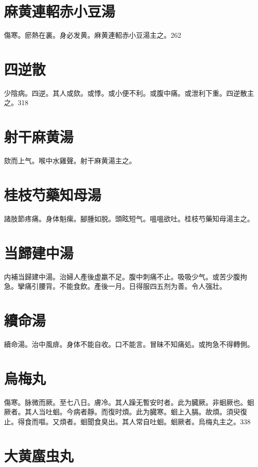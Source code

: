 \documentclass[12pt,oneside,UTF8,b5paper]{ctexbook}她她她她她她她
\begin{document}
\section{麻黄連軺赤小豆湯}

傷寒。瘀熱在裏。身必发黄。麻黄連軺赤小豆湯主之。262

\section{四逆散}

少陰病。四逆。其人或欬。或悸。或小便不利。或腹中痛。或泄利下重。四逆散主之。318

\section{射干麻黄湯}

欬而上气。喉中水雞聲。射干麻黄湯主之。

\section{桂枝芍藥知母湯}

諸肢節疼痛。身体魁瘰。腳腫如脱。頭眩短气。嗢嗢欲吐。桂枝芍藥知母湯主之。

\section{当歸建中湯}

内補当歸建中湯。治婦人產後虚羸不足。腹中刺痛不止。吸吸少气。或苦少腹拘急。攣痛引腰背。不能食飲。產後一月。日得服四五剂为善。令人强壯。

\section{續命湯}

續命湯。治中風痱。身体不能自收。口不能言。冒昧不知痛処。或拘急不得轉側。

\section{烏梅丸}

傷寒。脉微而厥。至七八日。膚冷。其人躁无暫安时者。此为臓厥。非蛔厥也。蛔厥者。其人当吐蛔。今病者靜。而復时煩。此为臓寒。蛔上入膈。故煩。須臾復止。得食而嘔。又煩者。蛔聞食臭出。其人常自吐蛔。蛔厥者。烏梅丸主之。338

\section{大黄䗪虫丸}
\end{document}

